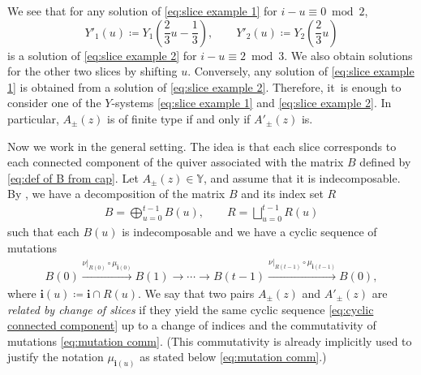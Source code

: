\documentclass[10pt,a4paper]{amsart}
\numberwithin{equation}{section}
\theoremstyle{definition}
\begin{document}
We see that for any solution of \eqref{eq:slice example 1} for $i- u \equiv 0 \bmod 2$,
\begin{equation*}
 Y'_1(u) \coloneqq Y_1 \left(\frac{2}{3}u - \frac{1}{3}\right),\qquad
 Y'_2(u) \coloneqq Y_2 \left(\frac{2}{3}u\right)
\end{equation*}
is a solution of \eqref{eq:slice example 2} for $i - u \equiv 2 \bmod 3$.
We also obtain solutions for the other two slices by shifting $u$.
Conversely, any solution of \eqref{eq:slice example 1} is obtained from a solution of \eqref{eq:slice example 2}.
Therefore, it~is enough to consider one of the $Y$-systems \eqref{eq:slice example 1} and \eqref{eq:slice example 2}.
In particular, $A_\pm(z)$ is of finite type if and only if $A'_\pm(z)$ is.

Now we work in the general setting.
The idea is that each slice corresponds to each connected component of the quiver
associated with the matrix $B$ defined by \eqref{eq:def of B from cap}.
Let $A_\pm(z) \in \mathbb{Y}$, and assume that it is indecomposable.
By \cite[Proposition 3.24]{mizuno2020difference}, we have a decomposition of
the matrix $B$ and its index set $R$
\begin{align*}
 B = \bigoplus_{u=0}^{t-1} B(u), \qquad
 R = \bigsqcup_{u=0}^{t-1} R(u)
\end{align*}
such that each $B(u)$ is indecomposable and we have a cyclic sequence of mutations
\begin{align}\label{eq:cyclic connected component}
 B(0) \xrightarrow{\nu|_{R(0)} \circ \mu_{\boldsymbol{i}(0)}} B(1)
 \longrightarrow
 \cdots
 \longrightarrow
 B(t-1)
 \xrightarrow{\nu|_{R(t-1)} \circ \mu_{\boldsymbol{i}(t-1)}}
 B(0),
\end{align}
where $\boldsymbol{i}(u) \coloneqq \boldsymbol{i} \cap R(u)$.
We say that two pairs $A_\pm(z)$ and $A'_\pm (z)$ are \emph{related by change of slices}
if they yield the same cyclic sequence \eqref{eq:cyclic connected component} up to a change
of indices and the commutativity of mutations \eqref{eq:mutation comm}. (This commutativity is
already implicitly used to justify the notation $\mu_{\boldsymbol{i}(u)}$ as stated below \eqref{eq:mutation comm}.)
\end{document}
